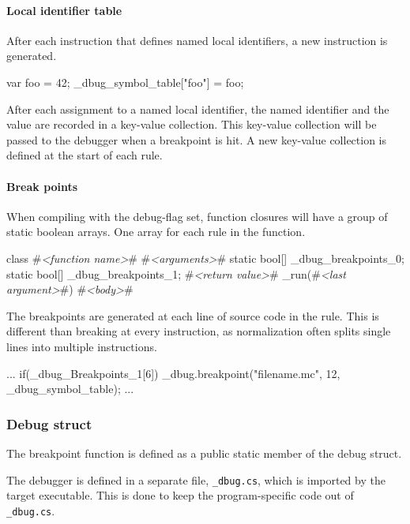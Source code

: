 \paragraph{Local identifier table}
After each instruction that defines named local identifiers, a new instruction is generated.

\begin{CS}
    var foo = 42;
    _dbug_symbol_table["foo"] = foo;
\end{CS}

After each assignment to a named local identifier, the named identifier and the value are recorded in a key-value collection. 
This key-value collection will be passed to the debugger when a breakpoint is hit.
A new key-value collection is defined at the start of each rule.

\paragraph{Break points}
When compiling with the debug-flag set, function closures will have a group of static boolean arrays.
One array for each rule in the function.

\begin{CS}[escapeinside=\#\#]
    class #\textit{<function name>}#{
        #\textit{<arguments>}#
        static bool[] _dbug_breakpoints_0;
        static bool[] _dbug_breakpoints_1;
        #\textit{<return value>}# _run(#\textit{<last argument>}#){
            #\textit{<body>}#
        }
    }
\end{CS}

The breakpoints are generated at each line of source code in the rule.
This is different than breaking at every instruction, as normalization often splits single lines into multiple instructions.

\begin{CS}
    ...
    if(_dbug_Breakpoints_1[6]){
        _dbug.breakpoint("filename.mc", 12, 
                         _dbug_symbol_table);
    }
    ...
\end{CS}

\subsubsection{Debug struct}
The breakpoint function is defined as a public static member of the debug struct.

The debugger is defined in a separate file, \verb|_dbug.cs|, which is imported by the target executable.
This is done to keep the program-specific code out of \verb|_dbug.cs|.


